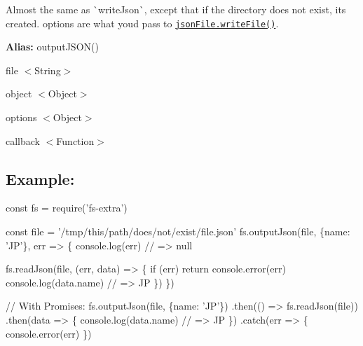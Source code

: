 Almost the same as \`{}write\+Json\`{}, except that if the directory does not exist, it\textquotesingle{}s created. {\ttfamily options} are what you\textquotesingle{}d pass to \href{https://github.com/jprichardson/node-jsonfile#writefilefilename-options-callback}{\tt {\ttfamily json\+File.\+write\+File()}}.

{\bfseries Alias\+:} {\ttfamily output\+J\+S\+O\+N()}


\begin{DoxyItemize}
\item {\ttfamily file} {\ttfamily $<$String$>$}
\item {\ttfamily object} {\ttfamily $<$Object$>$}
\item {\ttfamily options} {\ttfamily $<$Object$>$}
\item {\ttfamily callback} {\ttfamily $<$Function$>$}
\end{DoxyItemize}

\subsection*{Example\+:}


\begin{DoxyCode}
const fs = require('fs-extra')

const file = '/tmp/this/path/does/not/exist/file.json'
fs.outputJson(file, \{name: 'JP'\}, err => \{
  console.log(err) // => null

  fs.readJson(file, (err, data) => \{
    if (err) return console.error(err)
    console.log(data.name) // => JP
  \})
\})

// With Promises:
fs.outputJson(file, \{name: 'JP'\})
.then(() => fs.readJson(file))
.then(data => \{
  console.log(data.name) // => JP
\})
.catch(err => \{
  console.error(err)
\})
\end{DoxyCode}
 